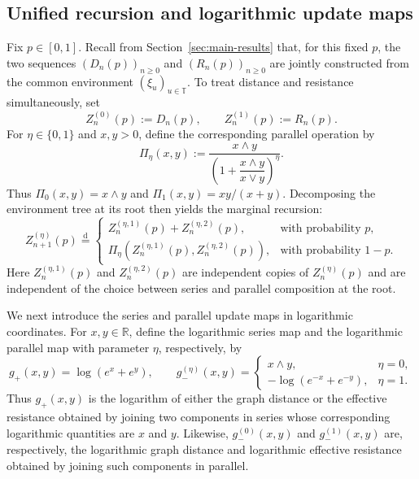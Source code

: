 \documentclass[12pt]{amsart}
\numberwithin{equation}{section}
\theoremstyle{plain}
\theoremstyle{definition}
\newcommand{\R}{\mathbb R}
\begin{document}
\subsection{Unified recursion and logarithmic update maps}
\label{sec:gate-properties}

Fix $p\in[0,1]$.
Recall from Section~\ref{sec:main-results} that, for this fixed $p$, the
two sequences $(D_n(p))_{n\ge0}$ and $(R_n(p))_{n\ge0}$ are jointly
constructed from the common environment $(\xi_u)_{u\in\mathbb T}$.
To treat distance and resistance simultaneously, set
\[
 Z_n^{(0)}(p):=D_n(p),
 \qquad
 Z_n^{(1)}(p):=R_n(p).
\]
For $\eta\in\{0,1\}$ and $x,y>0$, define the corresponding
parallel operation by
\begin{equation*}
\Pi_\eta(x,y)
 :=
 \frac{x\wedge y}
 {\left(1+\dfrac{x\wedge y}{x\vee y}\right)^\eta}.
\end{equation*}
Thus $\Pi_0(x,y)=x\wedge y$ and
$\Pi_1(x,y)=xy/(x+y)$.
Decomposing the environment tree at its root then yields the marginal
recursion:
\begin{equation}
 Z_{n+1}^{(\eta)}(p)
 \overset{\mathrm d}{=}
 \begin{cases}
 Z_n^{(\eta,1)}(p)+Z_n^{(\eta,2)}(p),&\text{with probability }p,\\[2mm]
 \Pi_\eta\!\left(Z_n^{(\eta,1)}(p),Z_n^{(\eta,2)}(p)\right),
     &\text{with probability }1-p.
 \end{cases}
 \label{eq:unified-rde}
\end{equation}
Here $Z_n^{(\eta,1)}(p)$ and $Z_n^{(\eta,2)}(p)$ are independent
copies of $Z_n^{(\eta)}(p)$ and are independent of the choice between
series and parallel composition at the root.

We next introduce the series and parallel update maps in logarithmic coordinates.
For $x,y\in\R$, define the
logarithmic series map and the logarithmic parallel map with parameter
$\eta$, respectively, by
\[
 g_+(x,y)=\log(e^x+e^y),
 \qquad
 g_-^{(\eta)}(x,y)=
 \begin{cases}
  x\wedge y,&\eta=0,\\
 -\log(e^{-x}+e^{-y}),&\eta=1.
 \end{cases}
\]
Thus $g_+(x,y)$ is the logarithm of either the graph distance or the effective
resistance obtained by joining two components in series whose corresponding
logarithmic quantities are $x$ and $y$.  Likewise, $g_-^{(0)}(x,y)$ and
$g_-^{(1)}(x,y)$ are, respectively, the logarithmic graph distance and
logarithmic effective resistance obtained by joining such components in
parallel.
\end{document}
